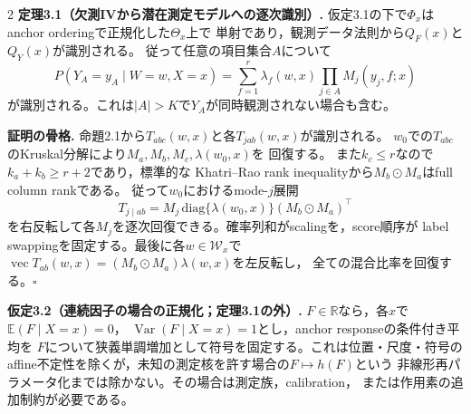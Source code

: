 \documentclass[a4paper,10pt]{article}
\newcommand{\E}{\mathbb E}
\begin{document}
\begin{multicols}{2}
\noindent\textbf{定理3.1（欠測IVから潜在測定モデルへの逐次識別）.}
仮定3.1の下で$\Phi_x$はanchor orderingで正規化した$\Theta_x$上で
単射であり，観測データ法則から$Q_F(x)$と$Q_Y(x)$が識別される。
従って任意の項目集合$A$について
\begin{equation}
P(Y_A=y_A\mid W=w,X=x)
=\sum_{f=1}^r\lambda_f(w,x)\prod_{j\in A}M_j(y_j,f;x)
\end{equation}
が識別される。これは$|A|>K$で$Y_A$が同時観測されない場合も含む。

\noindent\textbf{証明の骨格.}
命題2.1から$T_{abc}(w,x)$と各$T_{jab}(w,x)$が識別される。
$w_0$での$T_{abc}$のKruskal分解により$M_a,M_b,M_c,\lambda(w_0,x)$を
回復する。
また$k_c\le r$なので$k_a+k_b\ge r+2$であり，標準的な
Khatri--Rao rank inequalityから$M_b\odot M_a$はfull column rankである。
従って$w_0$におけるmode-$j$展開
\[
T_{j\mid ab}=M_j\,\mathrm{diag}\{\lambda(w_0,x)\}
(M_b\odot M_a)^\top
\]
を右反転して各$M_j$を逐次回復できる。確率列和がscalingを，score順序が
label swappingを固定する。最後に各$w\in\mathcal W_x$で
$\operatorname{vec}T_{ab}(w,x)=(M_b\odot M_a)\lambda(w,x)$を左反転し，
全ての混合比率を回復する。\hfill$\square$

\noindent\textbf{仮定3.2（連続因子の場合の正規化；定理3.1の外）.}
$F\in\mathbb R$なら，各$x$で$\E(F\mid X=x)=0$，
$\operatorname{Var}(F\mid X=x)=1$とし，anchor responseの条件付き平均を
$F$について狭義単調増加として符号を固定する。これは位置・尺度・符号の
affine不定性を除くが，未知の測定核を許す場合の$F\mapsto h(F)$という
非線形再パラメータ化までは除かない。その場合は測定族，calibration，
または作用素の追加制約が必要である。
\endgroup


\end{multicols}
\end{document}
